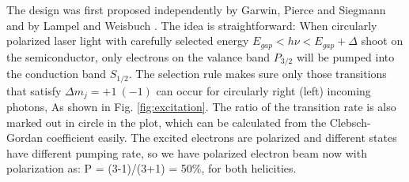 The design was first proposed independently by Garwin, Pierce and Siegmann \cite{GARWIN}
and by Lampel and Weisbuch \cite{LAMPEL1975877}. The idea is straightforward:
When circularly polarized laser light with carefully selected energy $E_{gap} < h\nu < E_{gap} + \Delta$
shoot on the semiconductor, only electrons on the valance band $P_{3/2}$ will be
pumped into the conduction band $S_{1/2}$. The selection rule makes sure only
those transitions that satisfy $\Delta m_j = +1 \ (-1)$ can occur for circularly
right (left) incoming photons, As shown in Fig. \ref{fig:excitation}.
The ratio of the transition rate is also marked out in circle in the plot, 
which can be calculated from the Clebsch-Gordan coefficient easily. The excited
electrons are polarized and different states have different pumping rate, so
we have polarized electron beam now with polarization as: P = (3-1)/(3+1) = 50\%,
for both helicities.
